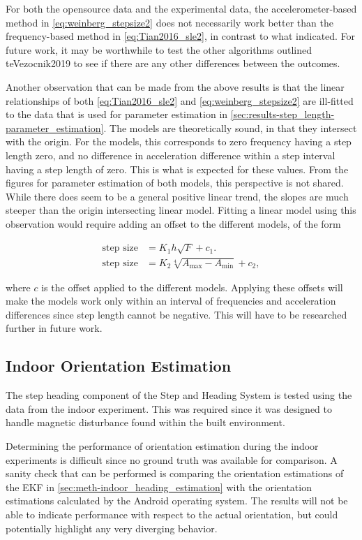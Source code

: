 For both the opensource data and the experimental data, the accelerometer-based method in \eqref{eq:weinberg_stepsize2} does not necessarily work better than the frequency-based method in \eqref{eq:Tian2016_sle2}, in contrast to what \citet{Vezocnik2019} indicated. For future work, it may be worthwhile to test the other algorithms outlined te{Vezocnik2019} to see if there are any other differences between the outcomes. \par 

Another observation that can be made from the above results is that the linear relationships of both \eqref{eq:Tian2016_sle2} and \eqref{eq:weinberg_stepsize2} are ill-fitted to the data that is used for parameter estimation in \cref{sec:results-step_length-parameter_estimation}. The models are theoretically sound, in that they intersect with the origin. For the models, this corresponds to zero frequency having a step length zero, and no difference in acceleration difference within a step interval having a step length of zero. This is what is expected for these values. From the figures for parameter estimation of both models, this perspective is not shared. While there does seem to be a general positive linear trend, the slopes are much steeper than the origin intersecting linear model. Fitting a linear model using this observation would require adding an offset to the different models, of the form

\begin{align}
	\text{step size} &= K_1 h \sqrt{F} + c_1. \\
	\text{step size} &= K_2 \sqrt[4]{A_{\max }-A_{\min }} + c_2,
\end{align}

where $ c $ is the offset applied to the different models. Applying these offsets will make the models work only within an interval of frequencies and acceleration differences since step length cannot be negative. This will have to be researched further in future work.


\subsection{Indoor Orientation Estimation}
\label{sec-results-Indoor orientation_estimation}
The step heading component of the Step and Heading System is tested using the data from the indoor experiment. This was required since it was designed to handle magnetic disturbance found within the built environment.\par 
Determining the performance of orientation estimation during the indoor experiments is difficult since no ground truth was available for comparison. A sanity check that can be performed is comparing the orientation estimations of the EKF in \cref{sec:meth-indoor_heading_estimation} with the orientation estimations calculated by the Android operating system. The results will not be able to indicate performance with respect to the actual orientation, but could potentially highlight any very diverging behavior. \par 

